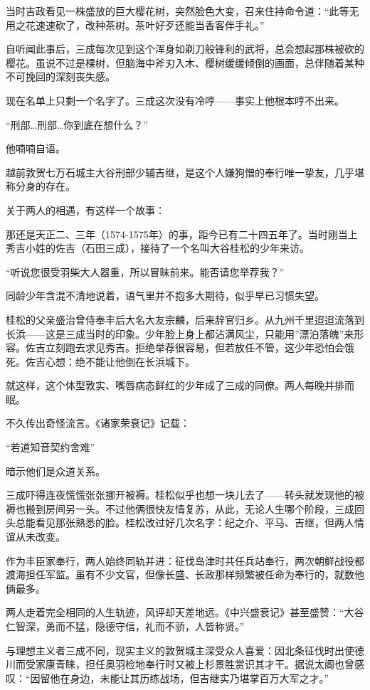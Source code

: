 \documentclass[
]{article}
\begin{document}
当时吉政看见一株盛放的巨大樱花树，突然脸色大变，召来住持命令道：``此等无用之花速速砍了，改种茶树。茶叶好歹还能当香客伴手礼。''

自听闻此事后，三成每次见到这个浑身如剃刀般锋利的武将，总会想起那株被砍的樱花。虽说不过是棵树，但脑海中斧刃入木、樱树缓缓倾倒的画面，总伴随着某种不可挽回的深刻丧失感。

现在名单上只剩一个名字了。三成这次没有冷哼------事实上他根本哼不出来。

``刑部\ldots 刑部\ldots 你到底在想什么？''

他喃喃自语。

越前敦贺七万石城主大谷刑部少辅吉继，是这个人嫌狗憎的奉行唯一挚友，几乎堪称分身的存在。

关于两人的相遇，有这样一个故事：

那还是天正二、三年（1574-1575年）的事，距今已有二十四五年了。当时刚当上秀吉小姓的佐吉（石田三成），接待了一个名叫大谷桂松的少年来访。

``听说您很受羽柴大人器重，所以冒昧前来。能否请您举荐我？''

同龄少年含混不清地说着，语气里并不抱多大期待，似乎早已习惯失望。

桂松的父亲盛治曾侍奉丰后大名大友宗麟，后来辞官归乡。从九州千里迢迢流落到长浜------这是三成当时的印象。少年脸上身上都沾满风尘，只能用''漂泊落魄''来形容。佐吉立刻跑去求见秀吉。拒绝举荐很容易，但若放任不管，这少年恐怕会饿死。佐吉心想：绝不能让他倒在长浜城下。

就这样，这个体型敦实、嘴唇病态鲜红的少年成了三成的同僚。两人每晚并排而眠。

不久传出奇怪流言。《诸家荣衰记》记载：

``若道知音契约舍难''

暗示他们是众道关系。

三成吓得连夜慌慌张张挪开被褥。桂松似乎也想一块儿去了------转头就发现他的被褥也搬到房间另一头。不过他俩很快友情复苏，从此，无论人生哪个阶段，三成回头总能看见那张熟悉的脸。桂松改过好几次名字：纪之介、平马、吉继，但两人情谊从未改变。

作为丰臣家奉行，两人始终同轨并进：征伐岛津时共任兵站奉行，两次朝鲜战役都渡海担任军监。虽有不少文官，但像长盛、长政那样频繁被任命为奉行的，就数他俩最多。

两人走着完全相同的人生轨迹，风评却天差地远。《中兴盛衰记》甚至盛赞：``大谷仁智深，勇而不猛，隐德守信，礼而不骄，人皆称贤。''

与理想主义者三成不同，现实主义的敦贺城主深受众人喜爱：因北条征伐时出使德川而受家康青睐，担任奥羽检地奉行时又被上杉景胜赏识其才干。据说太阁也曾感叹：``因留他在身边，未能让其历练战场，但吉继实乃堪掌百万大军之才。''
\end{document}
